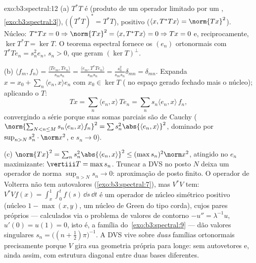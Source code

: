 \begin{solution}{exo:b3:spectral:12}
(a) $T^*T$ é  (produto de um operador limitado por um
, \cref{exo:b3:spectral:3}), 
($(T^*T)^* = T^*T$), positivo ($\langle x, T^*Tx\rangle =
\norm{Tx}^2$). Núcleo: $T^*Tx = 0 \Rightarrow \norm{Tx}^2 =
\langle x, T^*Tx\rangle = 0 \Rightarrow Tx = 0$ e,
reciprocamente, $\ker T^*T = \ker T$. O teorema espectral
fornece os $(e_n)$ ortonormais com $T^*Te_n = s_n^2e_n$,
$s_n > 0$, que geram $(\ker T)^\perp$.

(b) $\langle f_m, f_n\rangle = \frac{\langle Te_m,
Te_n\rangle}{s_ms_n} = \frac{\langle e_m,
T^*Te_n\rangle}{s_ms_n} = \frac{s_n^2}{s_ms_n}\delta_{mn} =
\delta_{mn}$. Expanda $x = x_0 + \sum_n\langle e_n, x\rangle
e_n$ com $x_0 \in \ker T$ ( no espaço gerado fechado mais o
núcleo); aplicando o  $T$:
\[
Tx = \sum_n\langle e_n, x\rangle\,Te_n =
\sum_ns_n\langle e_n, x\rangle\,f_n,
\]
convergindo a série porque suas somas parciais são de Cauchy
($\norm{\sum_{N<n\leq M}s_n\langle e_n, x\rangle f_n}^2 =
\sum s_n^2\abs{\langle e_n, x\rangle}^2$, dominado por
$\sup_{n>N}s_n^2\cdot\norm x^2$, e $s_n \to 0$).

(c) $\norm{Tx}^2 = \sum_ns_n^2\abs{\langle e_n, x\rangle}^2
\leq (\max s_n)^2\norm x^2$, atingido no $e_n$ maximizante: $\vertiii T = \max s_n$. Truncar a DVS no posto
$N$ deixa um operador de norma $\sup_{n>N}s_n \to 0$:
aproximação de posto finito. O operador de Volterra não tem
autovalores (\cref{exo:b3:spectral:7}), mas $V^*V$ tem:
$V^*Vf(x) = \int_x^1\int_0^tf(s)\,\dd s\,\dd t$ é um
operador de núcleo simétrico positivo (núcleo $1 - \max(x,y)$,
um núcleo de Green do tipo corda), cujos pares próprios --- calculados
via o problema de valores de contorno $-u'' = \lambda^{-1}u$, $u'(0)
= u(1) = 0$, isto é, a família do~\cref{exo:b3:spectral:9} --- dão
valores singulares $s_n = \bigl((n + \frac12)\pi\bigr)^{-1}$.
A DVS vive sobre \emph{duas} famílias ortonormais precisamente
porque $V$ gira sua geometria própria para longe: sem autovetores
e, ainda assim, com estrutura diagonal  entre duas bases diferentes.
\end{solution}

